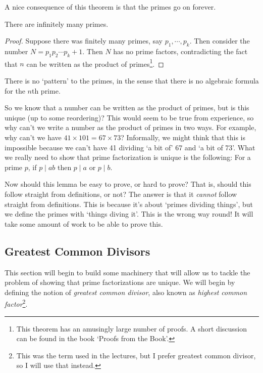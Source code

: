 \documentclass[a4paper]{scrreprt}
\begin{document}
A nice consequence of this theorem is that the primes go on forever.

\begin{theorem}[Euclid]
	There are infinitely many primes.
\end{theorem}
\begin{proof}
	Suppose there was finitely many primes, say $p_1, \cdots, p_k$. Then consider the number $N = p_1 p_2 \cdots p_k + 1$. Then $N$ has no prime factors, contradicting the fact that $n$ can be written as the product of primes\footnote{This theorem has an amusingly large number of proofs. A short discussion can be found in the book `Proofs from the Book'.}.
\end{proof}

\begin{remark}
	There is no `pattern' to the primes, in the sense that there is no algebraic formula for the $n$th prime. 
\end{remark}

So we know that a number can be written as the product of primes, but is this unique (up to some reordering)? This would seem to be true from experience, so why can't we write a number as the product of primes in two ways. For example, why can't we have $41 \times 101 = 67 \times 73$? Informally, we might think that this is impossible because we can't have 41 dividing `a bit of' 67 and `a bit of 73'. What we really need to show that prime factorization is unique is the following: For a prime $p$, if $p \mid ab$ then $p \mid a$ or $p \mid b$.

Now should this lemma be easy to prove, or hard to prove? That is, should this follow straight from definitions, or not? The answer is that it \emph{cannot} follow straight from definitions. This is because it's about `primes dividing things', but we define the primes with `things diving it'. This is the wrong way round! It will take some amount of work to be able to prove this.

\subsection{Greatest Common Divisors}

This section will begin to build some machinery that will allow us to tackle the problem of showing that prime factorizations are unique. We will begin by defining the notion of \emph{greatest common divisor}, also known as \emph{highest common factor}\footnote{This was the term used in the lectures, but I prefer greatest common divisor, so I will use that instead.}.
\end{document}
